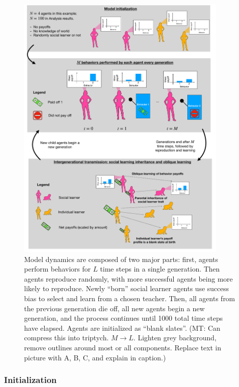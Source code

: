 \documentclass[letterpaper,11.5pt]{scrartcl}
\newcommand{\mt}[1]{{\textcolor{myorange} {({\tiny MT:} #1)}}}
\begin{document}
\begin{figure}
  \caption{Model dynamics are composed of two major parts: first, agents perform
  behaviors for $L$ time steps in a single generation. Then agents reproduce
  randomly, with more successful agents being more likely to reproduce. Newly
  ``born'' social learner agents use success bias to select and learn from a chosen
  teacher. Then, all agents from the previous generation die off, all new agents
  begin a new generation, and the process continues until 1000 total time steps
  have elapsed. Agents are initialized as ``blank slates''. \mt{Can compress this
  into triptych. $M \rightarrow L$. Lighten grey background, remove outlines
around most or all components. Replace text in picture with A, B, C, and 
explain in caption.}}
  \label{fig:IntraInterGenerationalDynamics}
  \centering
    \includegraphics[width=0.9\textwidth]{Figures/IntraInterGenerationalDynamics.pdf}
\end{figure}


\subsubsection{Initialization}
\end{document}
